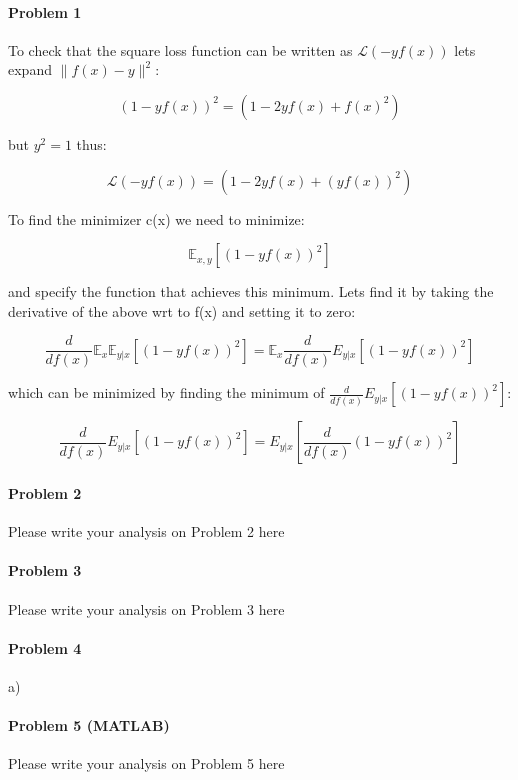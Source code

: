 \documentclass[12pt]{report}
\begin{document}
\maketitle

\paragraph{Problem 1}

To check that the square loss function can be written as $\mathcal{L}(-yf(x))$ lets expand $\|f(x) - y\|^2$:

$$(1-yf(x))^2 = (1 - 2yf(x) + f(x)^2)$$

but $y^2 = 1$ thus:

$$\mathcal{L}(-yf(x)) = (1 - 2yf(x) + (yf(x))^2)$$

To find the minimizer c(x) we need to minimize: 

$$\mathbb{E}_{x,y}[(1-yf(x))^2]$$

and specify the function that achieves this minimum. Lets find it by taking the derivative of the above wrt to f(x) and setting it to zero:

$$\frac{d}{df(x)}\mathbb{E}_{x}\mathbb{E}_{y|x}[(1-yf(x))^2] = \mathbb{E}_{x}\frac{d}{df(x)}{E}_{y|x}[(1-yf(x))^2]$$

which can be minimized by finding the minimum of $\frac{d}{df(x)}{E}_{y|x}[(1-yf(x))^2]$:

$$ \frac{d}{df(x)}{E}_{y|x}[(1-yf(x))^2] =  {E}_{y|x} \left[ \frac{d}{df(x)}(1-yf(x))^2 \right]$$


\paragraph{Problem 2}
Please write your analysis on Problem 2 here



\paragraph{Problem 3}
Please write your analysis on Problem 3 here


\paragraph{Problem 4}
a)



\paragraph{Problem 5 (MATLAB)}
Please write your analysis on Problem 5 here
\end{document}

